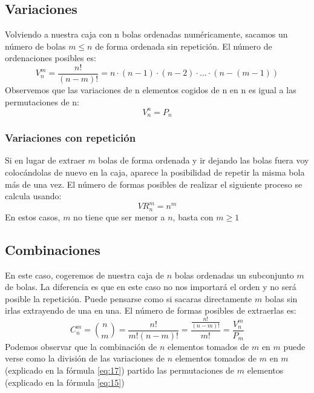 \documentclass[11pt]{article}
\theoremstyle{plain}
\begin{document}
            \subsection{Variaciones} %
            \label{sub:variaciones}
                Volviendo a nuestra caja con n bolas ordenadas numéricamente, sacamos un número de bolas $m \le n$ de forma ordenada sin repetición. El número de ordenaciones posibles es:
                \begin{equation}\label{eq:17}
                    V_n^m = \frac{n!}{(n-m)!} = n \cdot (n-1) \cdot (n-2) \cdot ... \cdot (n-(m-1))
                \end{equation}
                Observemos que las variaciones de n elementos cogidos de n en n es igual a las permutaciones de n: \[V_n^n = P_n\]
                \subsubsection{Variaciones con repetición} %
                \label{subsub:variaciones_con_repetición}
                    Si en lugar de extraer $m$ bolas de forma ordenada y ir dejando las bolas fuera voy colocándolas de nuevo en la caja, aparece la posibilidad de repetir la misma bola más de una vez. El número de formas posibles de realizar el siguiente proceso se calcula usando:
                    \begin{equation}
                        VR_n^m = n ^m 
                    \end{equation}
                    En estos casos, $m$ no tiene que ser menor a $n$, basta con $m\ge1$
            \subsection{Combinaciones} %
            \label{sub:combinaciones}
                En este caso, cogeremos de nuestra caja de $n$ bolas ordenadas un subconjunto $m$ de bolas. La diferencia es que en este caso no nos importará el orden y no será posible la repetición. Puede pensarse como si sacaras directamente $m$ bolas sin irlas extrayendo de una en una. El número de formas posibles de extraerlas es:
                \begin{equation}
                     {C_n^m} = \binom{n}{m} = \frac{n!}{m!(n-m)!} = \frac{\frac{n!}{(n-m)!}}{m!} = \frac{V_n^m}{P_m}
                 \end{equation} 
                 Podemos observar que la combinación de $n$ elementos tomados de $m$ en $m$ puede verse como la división de las variaciones de $n$ elementos tomados de $m$ en $m$ (explicado en la fórmula \ref{eq:17}) partido las permutaciones de $m$ elementos (explicado en la fórmula \ref{eq:15})\\
\end{document}
